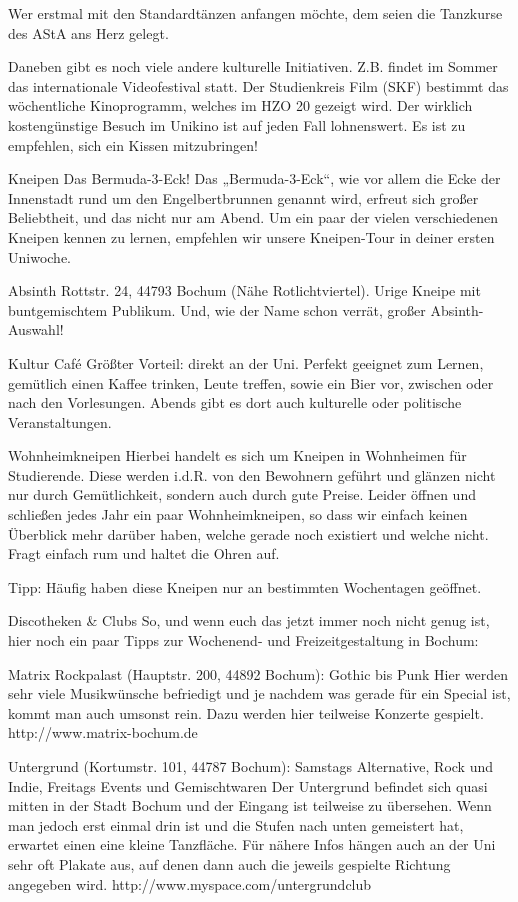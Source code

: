 Wer erstmal mit den Standardtänzen anfangen möchte, dem seien die Tanzkurse des AStA ans Herz gelegt.

Daneben gibt es noch viele andere kulturelle Initiativen. Z.B. findet im Sommer das internationale Videofestival statt. Der Studienkreis Film (SKF) bestimmt das wöchentliche Kinoprogramm, welches im HZO 20 gezeigt wird. Der wirklich kostengünstige Besuch im Unikino ist auf jeden Fall lohnenswert. Es ist zu empfehlen, sich ein Kissen mitzubringen!


Kneipen
Das Bermuda-3-Eck!
Das „Bermuda-3-Eck“, wie vor allem die Ecke der Innenstadt rund um den Engelbertbrunnen genannt wird, erfreut sich großer Beliebtheit, und das nicht nur am Abend. Um ein paar der vielen verschiedenen Kneipen kennen zu lernen, empfehlen wir unsere Kneipen-Tour in deiner ersten Uniwoche.

Absinth
Rottstr. 24, 44793 Bochum (Nähe Rotlichtviertel). Urige Kneipe mit buntgemischtem Publikum. Und, wie der Name schon verrät, großer Absinth-Auswahl!

Kultur Café
Größter Vorteil: direkt an der Uni. Perfekt geeignet zum Lernen, gemütlich einen Kaffee trinken, Leute treffen, sowie ein Bier vor, zwischen oder nach den Vorlesungen. Abends gibt es dort auch kulturelle oder politische Veranstaltungen.


Wohnheimkneipen
Hierbei handelt es sich um Kneipen in Wohnheimen für Studierende. Diese werden i.d.R. von den Bewohnern geführt und glänzen nicht nur durch Gemütlichkeit, sondern auch durch gute Preise. Leider öffnen und schließen jedes Jahr ein paar Wohnheimkneipen, so dass wir einfach keinen Überblick mehr darüber haben, welche gerade noch existiert und welche nicht. Fragt einfach rum und haltet die Ohren auf.

Tipp: Häufig haben diese Kneipen nur an bestimmten Wochentagen geöffnet.


Discotheken & Clubs
So, und wenn euch das jetzt immer noch nicht genug ist, hier noch ein paar Tipps zur Wochenend- und Freizeitgestaltung in Bochum:

Matrix Rockpalast (Hauptstr. 200, 44892  Bochum): Gothic bis Punk
Hier werden sehr viele Musikwünsche befriedigt und je nachdem was gerade für ein Special ist, kommt man auch umsonst rein. Dazu werden hier teilweise Konzerte gespielt.
http://www.matrix-bochum.de

Untergrund (Kortumstr. 101, 44787 Bochum): Samstags Alternative, Rock und Indie, Freitags Events und Gemischtwaren
Der Untergrund befindet sich quasi mitten in der Stadt Bochum und der Eingang ist teilweise zu übersehen. Wenn man jedoch erst einmal drin ist und die Stufen nach unten gemeistert hat, erwartet einen eine kleine Tanzfläche. Für nähere Infos hängen auch an der Uni sehr oft Plakate aus, auf denen dann auch die jeweils gespielte Richtung angegeben wird.
http://www.myspace.com/untergrundclub


